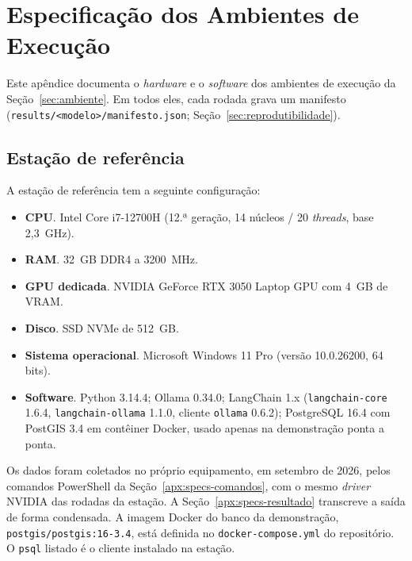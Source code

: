 

\chapter{Especificação dos Ambientes de \texorpdfstring{\mbox{Execução}}{Execução}}
\label{apx:specs}

\begin{sloppypar}
Este apêndice documenta o \textit{hardware} e o \textit{software} dos ambientes de execução da Seção~\ref{sec:ambiente}. Em todos eles, cada rodada grava um manifesto (\texttt{results/<modelo>/manifesto.json}; Seção~\ref{sec:reprodutibilidade}).
\end{sloppypar}

\section{Estação de referência}
\label{apx:specs-estacao}

A estação de referência tem a seguinte configuração:
\begin{itemize}
  \item \textbf{CPU}. Intel Core i7-12700H (12.ª geração, 14 núcleos / 20 \textit{threads}, base 2,3~GHz).
  \item \textbf{RAM}. 32~GB DDR4 a 3200~MHz.
  \item \textbf{GPU dedicada}. NVIDIA GeForce RTX 3050 Laptop GPU com 4~GB de VRAM.
  \item \textbf{Disco}. SSD NVMe de 512~GB.
  \item \textbf{Sistema operacional}. Microsoft Windows 11 Pro (versão 10.0.26200, 64 bits).
  \item \textbf{Software}. Python 3.14.4; Ollama 0.34.0; LangChain 1.x (\texttt{langchain-core} 1.6.4, \texttt{langchain-ollama} 1.1.0, cliente \texttt{ollama} 0.6.2); PostgreSQL 16.4 com PostGIS 3.4 em contêiner Docker, usado apenas na demonstração ponta a ponta.
\end{itemize}

Os dados foram coletados no próprio equipamento, em setembro de 2026, pelos comandos PowerShell da Seção~\ref{apx:specs-comandos}, com o mesmo \textit{driver} NVIDIA das rodadas da estação. A Seção~\ref{apx:specs-resultado} transcreve a saída de forma condensada. A imagem Docker do banco da demonstração, \texttt{postgis/postgis:16-3.4}, está definida no \texttt{docker-compose.yml} do repositório. O \texttt{psql} listado é o cliente instalado na estação.

